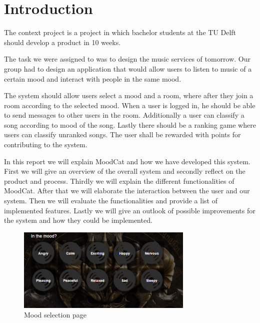 \chapter{Introduction}

The context project is a project in which bachelor students at the TU Delft should develop a product in 10 weeks.

The task we were assigned to was to design the music services of tomorrow.
Our group had to design an application that would allow users to listen to music of a certain mood and interact with people in the same mood.


The system should allow users select a mood and a room, where after they join a room according to the selected mood.
When a user is logged in, he should be able to send messages to other users in the room.
Additionally a user can classify a song according to mood of the song.
Lastly there should be a ranking game where users can classify unranked songs.
The user shall be rewarded with points for contributing to the system.


In this report we will explain MoodCat and how we have developed this system.
First we will give an overview of the overall system and secondly reflect on the product and process.
Thirdly we will explain the different functionalities of MoodCat.
After that we will elaborate the interaction between the user and our system.
Then we will evaluate the functionalities and provide a list of implemented features.
Lastly we will give an outlook of possible improvements for the system and how they could be implemented.\\

\begin{figure}
\centering
\includegraphics[width= 0.75\textwidth]{moodselection.png}
\caption{Mood selection page}
\end{figure}
